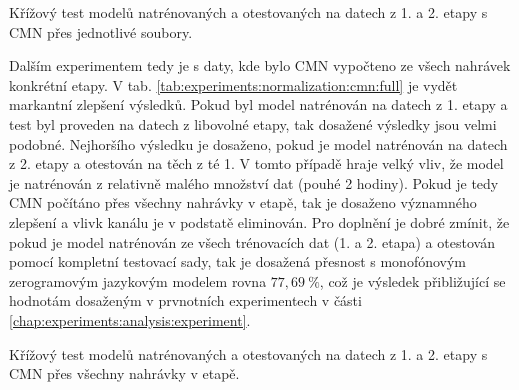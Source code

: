 \begin{table}[htpb]
  \centering
  \def\arraystretch{1.5}
  \caption{Křížový test modelů natrénovaných a otestovaných na datech z 1. a 2. etapy s CMN přes jednotlivé soubory.}
  \label{tab:experiments:normalization:cmn:file}
\end{table}

Dalším experimentem tedy je s daty, kde bylo CMN vypočteno ze všech nahrávek konkrétní etapy. V tab. \ref{tab:experiments:normalization:cmn:full} je vydět markantní zlepšení výsledků. Pokud byl model natrénován na datech z 1. etapy a test byl proveden na datech z libovolné etapy, tak dosažené výsledky jsou velmi podobné. Nejhoršího výsledku je dosaženo, pokud je model natrénován na datech z 2. etapy a otestován na těch z té 1. V tomto případě hraje velký vliv, že model je natrénován z relativně malého množství dat (pouhé 2 hodiny). Pokud je tedy CMN počítáno přes všechny nahrávky v etapě, tak je dosaženo významného zlepšení a vlivk kanálu je v podstatě eliminován. Pro doplnění je dobré zmínit, že pokud je model natrénován ze všech trénovacích dat (1. a 2. etapa) a otestován pomocí kompletní testovací sady, tak je dosažená přesnost s monofónovým zerogramovým jazykovým modelem rovna $77,69\ \%$, což je výsledek přibližující se hodnotám dosaženým v prvnotních experimentech v části \ref{chap:experiments:analysis:experiment}.

\begin{table}[htpb]
  \centering
  \def\arraystretch{1.5}
  \caption{Křížový test modelů natrénovaných a otestovaných na datech z 1. a 2. etapy s CMN přes všechny nahrávky v etapě.}
  \label{tab:experiments:normalization:cmn:full}
\end{table}

